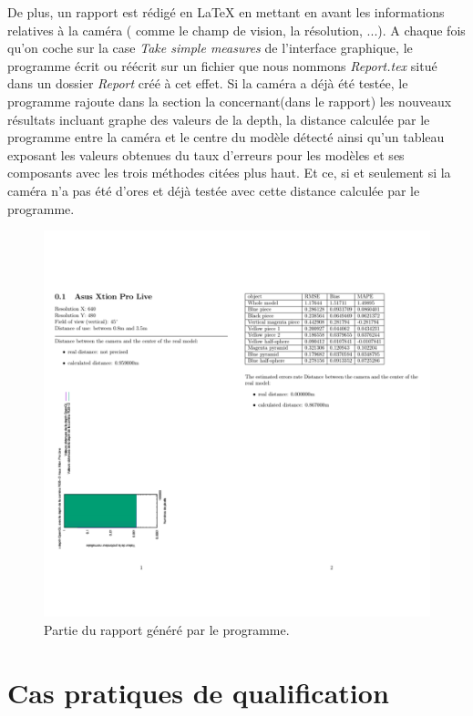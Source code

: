 \documentclass[a4paper, 12pt]{book}
\newcounter{program}[subsection]
\begin{document}
\par De plus, un rapport est rédigé en \LaTeX{} en mettant en avant les informations relatives à la caméra ( comme le champ de vision, la résolution, ...). A chaque fois qu'on coche sur la case \textit{Take simple measures} de l'interface graphique, le programme écrit ou réécrit sur un fichier que nous nommons \emph{Report.tex} situé dans un dossier \emph{Report} créé à cet effet. Si la caméra a déjà été testée, le programme rajoute dans la section la concernant(dans le rapport) les nouveaux résultats incluant graphe des valeurs de la depth, la distance calculée par le programme entre la caméra et le centre du modèle détecté ainsi qu'un tableau exposant les valeurs obtenues du taux d'erreurs pour les modèles et ses composants  avec les trois méthodes citées plus haut. Et ce, si et seulement si la caméra n'a pas été d'ores et déjà testée avec cette distance calculée par le programme.


\begin{figure}[htbp]
 \includegraphics[scale=0.25]{images/report.png} \hspace{2cm}
  \caption{Partie du rapport généré par le programme.\label{fig-report}}
\end{figure}
\chapter{Cas pratiques de qualification}
\end{document}
